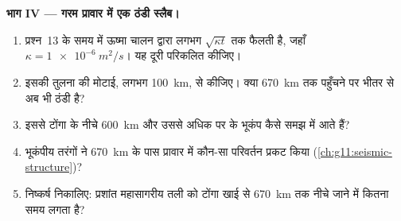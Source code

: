 \begin{problem}
\medskip
\noindent\textbf{भाग IV --- गरम प्रावार में एक ठंडी स्लैब।}
\begin{enumerate}[resume]
  \item प्रश्न~13 के समय में ऊष्मा चालन द्वारा लगभग
        $\sqrt{\kappa t}$ तक फैलती है, जहाँ $\kappa = \qty{1e-6}{m^2/s}$। यह
        दूरी परिकलित कीजिए।
  \item इसकी तुलना  की मोटाई, लगभग \qty{100}{km}, से कीजिए। क्या
        \qty{670}{km} तक पहुँचने पर  भीतर से अब भी ठंडी है?
  \item इससे टोंगा के नीचे \qty{600}{km} और उससे अधिक पर के भूकंप
        कैसे समझ में आते हैं?
  \item भूकंपीय तरंगों ने \qty{670}{km} के पास प्रावार में कौन-सा परिवर्तन
        प्रकट किया (\cref{ch:g11:seismic-structure})?
  \item निष्कर्ष निकालिए: प्रशांत महासागरीय तली को टोंगा
        खाई से \qty{670}{km} तक नीचे जाने में कितना समय लगता है?
\end{enumerate}
\end{problem}
